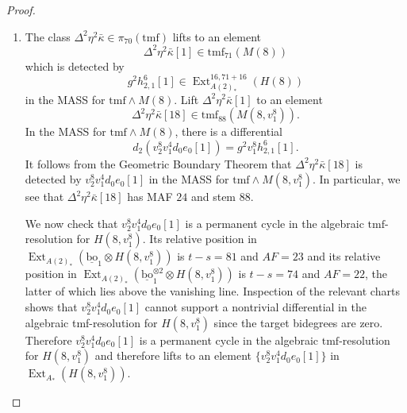 \documentclass[10pt]{amsart}
\newcommand{\ul}[1]{\underline{#1}}
\newcommand{\tmf}{\mathrm{tmf}}
\newcommand{\bo}{\mathrm{bo}}
\newcommand{\bou}{\ul{\bo}}
\theoremstyle{definition}
\numberwithin{equation}{section}
\numberwithin{figure}{section}
\DeclareMathOperator{\Ext}{Ext}
\begin{document}
\begin{proof}
\begin{enumerate}
We now check that $v_2^{10} v_1^4 d_0 h_0[1]$ is a permanent cycle in the algebraic $\tmf$-resolution for $H(8,v_1^8)$. Its relative position in $\Ext_{A(2)_*}(\bou_1 \otimes H(8,v_1^8))$ is $t-s = 76$ and $AF = 20$, its relative position in $\Ext_{A(2)_*}(\bou_1^{\otimes 2} \otimes H(8,v_1^8))$ is $t-s = 69$ and $AF = 19$, and its relative position in $\Ext_{A(2)_*}(\bou_1^{\otimes 3} \otimes H(8,v_1^8))$ is $t-s = 62$ and $AF = 18$, the last of which has targets only above the vanishing line. Inspection of the relevant charts shows that $v_2^{10} v_1^4 d_0 h_0[1]$ cannot support a nontrivial $d_1$-differential since the target bidegrees are zero. Therefore $v_2^{10} v_1^4 d_0 h_0[1]$ is a permanent cycle in the algebraic $\tmf$-resolution for $H(8,v_1^8)$ and detects an element $\{v_2^{10} v_1^4 d_0 h_0[1]\}$ in $\Ext_{A_*}(H(8,v_1^8))$. 

Finally, inspection of the same charts reveals that there are no possible targets for a nontrivial differential supported by $\{v_2^{10} v_1^4 d_0 h_0[1]\}$ in the MASS for $M(8,v_1^8)$. Therefore $\{v_2^{10} v_1^4 d_0 h_0[1]\}$ is a permanent cycle. 
\vspace{10pt}

\item The class $\Delta^2 \eta^2 \bar{\kappa} \in \pi_{70}(\tmf)$ lifts to an element 
$$\Delta^2 \eta^2 \bar{\kappa} [1] \in \tmf_{71}(M(8))$$
which is detected by 
$$g^2h^6_{2,1}[1] \in \Ext^{16,71+16}_{A(2)_*}(H(8))$$
in the MASS for $\tmf \wedge M(8)$. Lift $\Delta^2 \eta^2 \bar{\kappa}[1]$ to an element 
$$\Delta^2 \eta^2 \bar{\kappa}[18] \in \tmf_{88}(M(8,v_1^8)).$$ 
In the MASS for $\tmf \wedge M(8)$, there is a differential 
$$d_2(v_2^{8} v_1^4 d_0 e_0[1]) = g^2 v_1^8 h_{2,1}^6[1].$$
It follows from the Geometric Boundary Theorem that $\Delta^2 \eta^2 \bar{\kappa}[18]$ is detected by $v_2^{8} v_1^4 d_0 e_0[1]$ in the MASS for $\tmf \wedge M(8,v_1^8)$. In particular, we see that $\Delta^2 \eta^2 \bar{\kappa}[18]$ has MAF $24$ and stem $88$. 

We now check that $v_2^{8} v_1^4 d_0 e_0[1]$ is a permanent cycle in the algebraic $\tmf$-resolution for $H(8,v_1^8)$. Its relative position in $\Ext_{A(2)_*}(\bou_1 \otimes H(8,v_1^8))$ is $t-s = 81$ and $AF = 23$ and its relative position in $\Ext_{A(2)_*}(\bou_1^{\otimes 2} \otimes H(8,v_1^8))$ is $t-s = 74$ and $AF = 22$, the latter of which lies above the vanishing line. Inspection of the relevant charts shows that $v_2^{8} v_1^4 d_0 e_0[1]$ cannot support a nontrivial differential in the algebraic tmf-resolution for $H(8,v_1^8)$ since the target bidegrees are zero. Therefore $v_2^{8} v_1^4 d_0 e_0[1]$ is a permanent cycle in the algebraic $\tmf$-resolution for $H(8,v_1^8)$ and therefore lifts to an element $\{v_2^{8} v_1^4 d_0 e_0[1]\}$ in $\Ext_{A_*}(H(8,v_1^8))$. 


\end{enumerate}
\end{proof}
\end{document}
